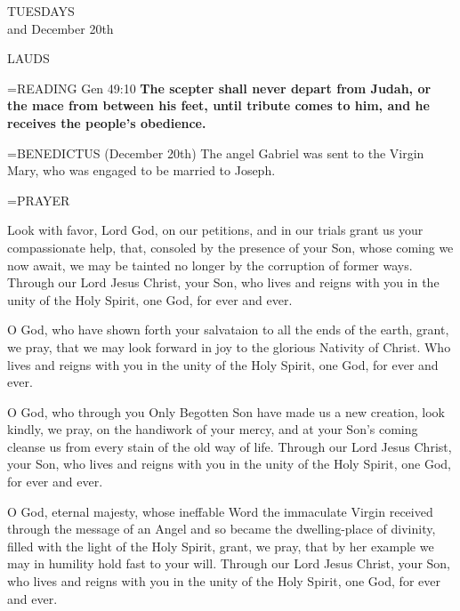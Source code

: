 \begin{center}\normalsize TUESDAYS\\
\footnotesize and December 20th\\
\end{center}

\begin{flushleft}\normalsize LAUDS\\\end{flushleft}

\hangindent=\parindent \small{\uppercase{READING}} Gen 49:10 \textbf{The scepter shall never depart from Judah, or the mace from between his feet, until tribute comes to him, and he receives the people’s obedience.\\}

\hangindent=\parindent \small{BENEDICTUS  (December 20th) The angel Gabriel was sent to the Virgin Mary, who was engaged to be married to Joseph.\\}

\hangindent=\parindent \small PRAYER
\begin{description}[labelindent=\parindent, leftmargin=*]
\item [Week 1:]  Look with favor, Lord God, on our petitions, and in our trials grant us your compassionate help, that, consoled by the presence of your Son, whose coming we now await, we may be tainted no longer by the corruption of former ways. Through our Lord Jesus Christ, your Son, who lives and reigns with you in the unity of the Holy Spirit, one God, for ever and ever.
\item [Week 2:]  O God, who have shown forth your salvataion to all the ends of the earth, grant, we pray, that we may look forward in joy to the glorious Nativity of Christ. Who lives and reigns with you in the unity of the Holy Spirit, one God, for ever and ever.
\item [Week 3:]  O God, who through you Only Begotten Son have made us a new creation, look kindly, we pray, on the handiwork of your mercy, and at your Son's coming cleanse us from every stain of the old way of life. Through our Lord Jesus Christ, your Son, who lives and reigns with you in the unity of the Holy Spirit, one God, for ever and ever.
\item [December 20th:]  O God, eternal majesty, whose ineffable Word the immaculate Virgin received through the message of an Angel and so became the dwelling-place of divinity, filled with the light of the Holy Spirit, grant, we pray, that by her example we may in humility hold fast to your will. Through our Lord Jesus Christ, your Son, who lives and reigns with you in the unity of the Holy Spirit, one God, for ever and ever.
\end{description}

